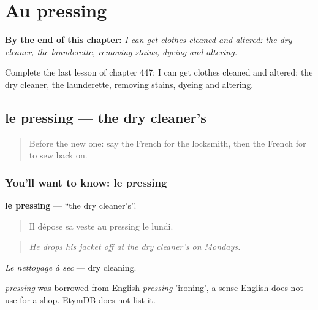 
\chapter{Au pressing}
\label{ch:fr-au-pressing}

\begin{chapteropening}
\textbf{By the end of this chapter:} \emph{I can get clothes cleaned and altered: the dry cleaner, the launderette, removing stains, dyeing and altering.}

Complete the last lesson of chapter 447: I can get clothes cleaned and altered: the dry cleaner, the launderette, removing stains, dyeing and altering.
\end{chapteropening}

\section[le pressing]{le pressing — the dry cleaner’s}

\label{lesson:FR-C447-pressing}



\begin{quote}
Before the new one: say the French for the locksmith, then the French for to sew back on.
\end{quote}

\subsection*{You'll want to know: le pressing}
\textbf{le pressing} — \textquotedblleft{}the dry cleaner’s\textquotedblright{}.

\begin{quote}
Il dépose sa veste au pressing le lundi.
\end{quote}

\begin{quote}
\emph{He drops his jacket off at the dry cleaner's on Mondays.}
\end{quote}

\emph{Le nettoyage à sec} — dry cleaning.

\begin{cousinweb}
\emph{pressing} was borrowed from English \emph{pressing} 'ironing', a sense English does not use for a shop. EtymDB does not list it.
\end{cousinweb}

